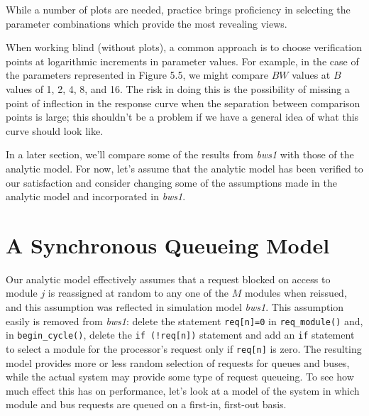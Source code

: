 \noindent While a number of plots are needed, practice brings proficiency in selecting
the parameter combinations which provide the most revealing views.

When working blind (without plots), a common approach is to choose
verification points at logarithmic increments in parameter values. For
example, in the case of the parameters represented in Figure 5.5, we might
compare $BW$ values at $B$ values of 1, 2, 4, 8, and 16. The risk in doing this is
the possibility of missing a point of inflection in the response curve when the
separation between comparison points is large; this shouldn't be a problem if
we have a general idea of what this curve should look like.

In a later section, we'll compare some of the results from \emph{bws1} with those
of the analytic model. For now, let's assume that the analytic model has
been verified to our satisfaction and consider changing some of the assumptions
made in the analytic model and incorporated in \emph{bws1}.

\section{A Synchronous Queueing Model}

Our analytic model effectively assumes that a request blocked on access
to module $j$ is reassigned at random to any one of the $M$ modules when
reissued, and this assumption was reflected in simulation model \emph{bws1}. This
assumption easily is removed from \emph{bws1}: delete the statement \texttt{req[n]=0} in
\texttt{req\_module()} and, in \texttt{begin\_cycle()}, delete the \texttt{if (!req[n])} statement
and add an \texttt{if} statement to select a module for the processor's request
only if \texttt{req[n]} is zero. The resulting model provides more or less random
selection of requests for queues and buses, while the actual system may
provide some type of request queueing. To see how much effect this has on
performance, let's look at a model of the system in which module and bus
requests are queued on a first-in, first-out basis.

